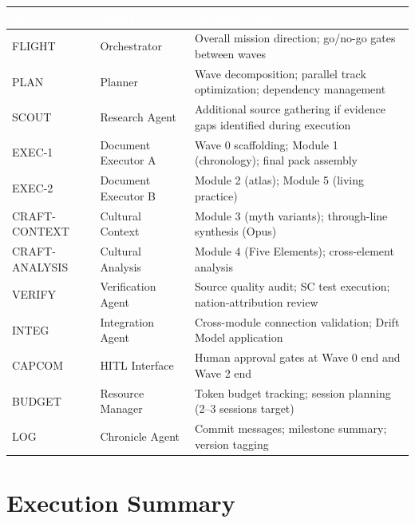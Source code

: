 \documentclass[11pt,letterpaper]{article}
\newcommand{\tableheader}[1]{\textbf{\sffamily\textcolor{white}{#1}}}
\begin{document}
\begin{center}
\begin{tabularx}{\textwidth}{L{2cm}L{3cm}X}
\toprule
{}
\tableheader{Role} & \tableheader{Agent} & \tableheader{Responsibility} \\
\midrule
FLIGHT & Orchestrator & Overall mission direction; go/no-go gates between waves \\
PLAN & Planner & Wave decomposition; parallel track optimization; dependency management \\
SCOUT & Research Agent & Additional source gathering if evidence gaps identified during execution \\
EXEC-1 & Document Executor A & Wave 0 scaffolding; Module 1 (chronology); final pack assembly \\
EXEC-2 & Document Executor B & Module 2 (atlas); Module 5 (living practice) \\
CRAFT-CONTEXT & Cultural Context & Module 3 (myth variants); through-line synthesis (Opus) \\
CRAFT-ANALYSIS & Cultural Analysis & Module 4 (Five Elements); cross-element analysis \\
VERIFY & Verification Agent & Source quality audit; SC test execution; nation-attribution review \\
INTEG & Integration Agent & Cross-module connection validation; Drift Model application \\
CAPCOM & HITL Interface & Human approval gates at Wave 0 end and Wave 2 end \\
BUDGET & Resource Manager & Token budget tracking; session planning (2--3 sessions target) \\
LOG & Chronicle Agent & Commit messages; milestone summary; version tagging \\
\bottomrule
\end{tabularx}
\end{center}

\section{Execution Summary}
\end{document}
